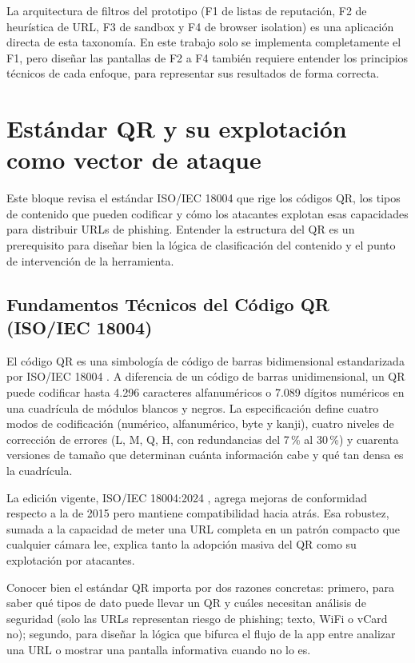 La arquitectura de filtros del prototipo (F1 de listas de reputaci\'on, F2 de heur\'istica de URL, F3 de sandbox y F4 de browser isolation) es una aplicaci\'on directa de esta taxonom\'ia. En este trabajo solo se implementa completamente el F1, pero dise\~nar las pantallas de F2 a F4 tambi\'en requiere entender los principios t\'ecnicos de cada enfoque, para representar sus resultados de forma correcta.

\section{Est\'andar QR y su explotaci\'on como vector de ataque}

Este bloque revisa el est\'andar ISO/IEC 18004 que rige los c\'odigos QR, los tipos de contenido que pueden codificar y c\'omo los atacantes explotan esas capacidades para distribuir URLs de phishing. Entender la estructura del QR es un prerequisito para dise\~nar bien la l\'ogica de clasificaci\'on del contenido y el punto de intervenci\'on de la herramienta.

\subsection{Fundamentos T\'ecnicos del C\'odigo QR (ISO/IEC 18004)}

El c\'odigo QR es una simbolog\'ia de c\'odigo de barras bidimensional estandarizada por ISO/IEC 18004 \cite{iso18004_2015,iso18004_2024}. A diferencia de un c\'odigo de barras unidimensional, un QR puede codificar hasta 4.296 caracteres alfanum\'ericos o 7.089 d\'igitos num\'ericos en una cuadr\'icula de m\'odulos blancos y negros. La especificaci\'on define cuatro modos de codificaci\'on (num\'erico, alfanum\'erico, byte y kanji), cuatro niveles de correcci\'on de errores (L, M, Q, H, con redundancias del 7\,\% al 30\,\%) y cuarenta versiones de tama\~no que determinan cu\'anta informaci\'on cabe y qu\'e tan densa es la cuadr\'icula.

La edici\'on vigente, ISO/IEC 18004:2024 \cite{iso18004_2024}, agrega mejoras de conformidad respecto a la de 2015 pero mantiene compatibilidad hacia atr\'as. Esa robustez, sumada a la capacidad de meter una URL completa en un patr\'on compacto que cualquier c\'amara lee, explica tanto la adopci\'on masiva del QR como su explotaci\'on por atacantes.

Conocer bien el est\'andar QR importa por dos razones concretas: primero, para saber qu\'e tipos de dato puede llevar un QR y cu\'ales necesitan an\'alisis de seguridad (solo las URLs representan riesgo de phishing; texto, WiFi o vCard no); segundo, para dise\~nar la l\'ogica que bifurca el flujo de la app entre analizar una URL o mostrar una pantalla informativa cuando no lo es.

